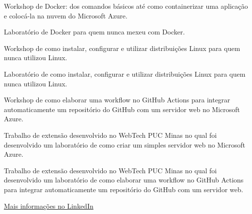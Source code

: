 
Workshop de Docker: dos comandos básicos até como containerizar uma aplicação e colocá-la na nuvem do Microsoft Azure.\\
\divider

Laboratório de Docker para quem nunca mexeu com Docker.\\
\divider

Workshop de como instalar, configurar e utilizar distribuições Linux para quem nunca utilizou Linux.\\
\divider

Laboratório de como instalar, configurar e utilizar distribuições Linux para quem nunca utilizou Linux.\\
\divider

Workshop de como elaborar uma workflow no GitHub Actions para integrar automaticamente um repositório do GitHub com um servidor web no Microsoft Azure.\\
\divider
        
Trabalho de extensão desenvolvido no WebTech PUC Minas no qual foi desenvolvido um laboratório de como criar um simples servidor web no Microsoft Azure.\\
\divider
        
Trabalho de extensão desenvolvido no WebTech PUC Minas no qual foi desenvolvido um laboratório de como elaborar uma workflow no GitHub Actions para integrar automaticamente um repositório do GitHub com um servidor web.\\
\divider

{\large\color{emphasis}\href{https://www.linkedin.com/in/henriquemcc/details/projects/}{Mais informações no LinkedIn}}
